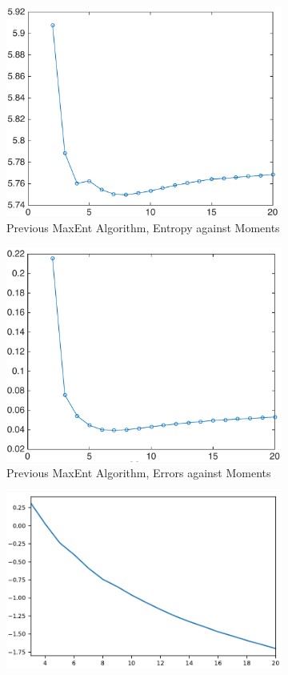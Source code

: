 \documentclass[letterpaper]{article} %
\begin{document}
\begin{figure}
	\begin{subfigure}%
		\centering
		\includegraphics[width=.8\linewidth]{momentsentropy_smpl_30_dataset_thermomech_TCcrop}
		\caption{Previous MaxEnt Algorithm, Entropy against Moments}
		\label{fig:previousmaxentmomentsentropy}
	\end{subfigure}
	\begin{subfigure}%
		\centering
		\includegraphics[width=.8\linewidth]{momentserror_smpl_30_dataset_thermomech_TCcrop}
		\caption{Previous MaxEnt Algorithm, Errors against Moments}
		\label{fig:previousmaxentmomentserror}
	\end{subfigure}
	\begin{subfigure}%
		\centering
		\includegraphics[width=0.9\linewidth]{entropyvsmomentsthermonewcrop}

\end{subfigure}
\end{figure}
\end{document}
